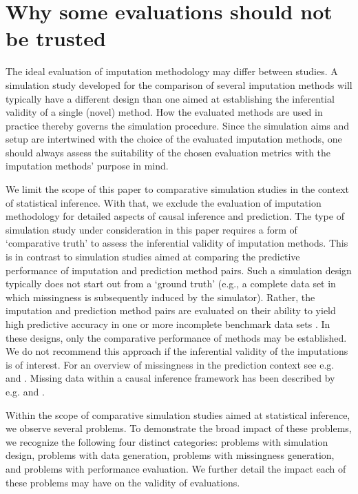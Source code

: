 \documentclass[bimj,fleqn]{w-art}
\begin{document}

\section{Why some evaluations should not be trusted}

The ideal evaluation of imputation methodology may differ between studies. A simulation study developed for the comparison of several imputation methods will typically have a different design than one aimed at establishing the inferential validity of a single (novel) method. How the evaluated methods are used in practice thereby governs the simulation procedure. Since the simulation aims and setup are intertwined with the choice of the evaluated imputation methods, one should always assess the suitability of the chosen evaluation metrics with the imputation methods' purpose in mind. 

We limit the scope of this paper to comparative simulation studies in the context of statistical inference. With that, we exclude the evaluation of imputation methodology for detailed aspects of causal inference and prediction. The type of simulation study under consideration in this paper requires a form of `comparative truth' to assess the inferential validity of imputation methods. This is in contrast to simulation studies aimed at comparing the predictive performance of imputation and prediction method pairs. Such a simulation design typically does not start out from a `ground truth' (e.g., a complete data set in which missingness is subsequently induced by the simulator). Rather, the imputation and prediction method pairs are evaluated on their ability to yield high predictive accuracy in one or more incomplete benchmark data sets \citep{liu21}. In these designs, only the comparative performance of methods may be established. We do not recommend this approach if the inferential validity of the imputations is of interest. For an overview of missingness in the prediction context see e.g. \citet{wood15} and \citet{sper20}. Missing data within a causal inference framework has been described by e.g. \cite{more18} and \cite{moha21}.

Within the scope of comparative simulation studies aimed at statistical inference, we observe several problems. To demonstrate the broad impact of these problems, we recognize the following four distinct categories: problems with simulation design, problems with data generation, problems with missingness generation, and problems with performance evaluation. We further detail the impact each of these problems may have on the validity of evaluations. 
\end{document}
